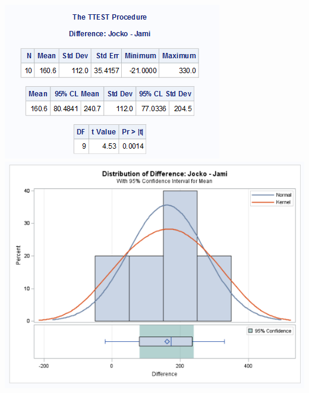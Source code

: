 \begin{center}
\includegraphics[scale=0.8]{autopaired1}\includegraphics[scale=0.6]{autopaired2}\\

\end{center}
